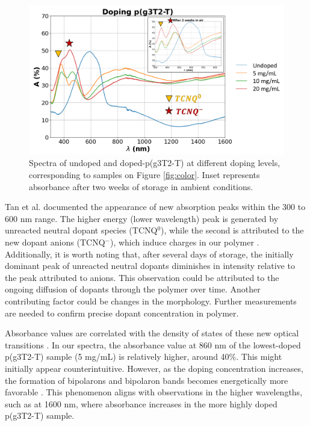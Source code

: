 \begin{figure}[ht]
  \centering
  \includegraphics[width=11.5cm]{Images/pdf/abs+inlet.pdf}
  \caption[Absorbance spectra of different doping levels of p(g3T2-T)]{Spectra of undoped and doped-p(g3T2-T) at different doping levels, corresponding to samples on Figure \ref{fig:color}. Inset represents absorbance after two weeks of storage in ambient conditions.}
  \label{fig:abs}
\end{figure}

Tan et al. documented the appearance of new absorption peaks within the 300 to 600 nm range. The higher energy (lower wavelength) peak is generated by unreacted neutral dopant species (TCNQ$^{0}$), while the second is attributed to the new dopant anions (TCNQ$^{-}$), which induce charges in our polymer \cite{tanTuningOrganicElectrochemical2022}. Additionally, it is worth noting that, after several days of storage, the initially dominant peak of unreacted neutral dopants diminishes in intensity relative to the peak attributed to anions. This observation could be attributed to the ongoing diffusion of dopants through the polymer over time. Another contributing factor could be changes in the morphology. Further measurements are needed to confirm precise dopant concentration in polymer. 

Absorbance values are correlated with the density of states of these new optical transitions \cite{bredasPolaronsBipolaronsSolitons1985}. In our spectra, the absorbance value at 860 nm of the lowest-doped p(g3T2-T) sample (5 mg/mL) is relatively higher, around 40\%. This might initially appear counterintuitive. However, as the doping concentration increases, the formation of bipolarons and bipolaron bands becomes energetically more favorable \cite{enenglDopinginducedAbsorptionBands2016} . This phenomenon aligns with observations in the higher wavelengths, such as at 1600 nm, where absorbance increases in the more highly doped p(g3T2-T) sample.

